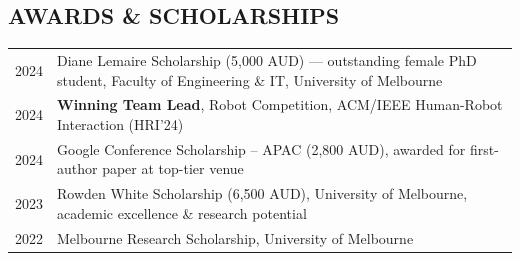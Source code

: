 \documentclass[a4paper, 11pt]{article}
\begin{document}
{\subsection{AWARDS \& SCHOLARSHIPS}
\vspace{2pt}

\noindent
\begin{tabularx}{\textwidth}{@{}lX@{}}
2024 & Diane Lemaire Scholarship (5,000 AUD) --- outstanding female PhD student, Faculty of Engineering \& IT, University of Melbourne \\[2pt]
2024 & \textbf{Winning Team Lead}, Robot Competition, ACM/IEEE Human-Robot Interaction (HRI'24) \\[2pt]
2024 & Google Conference Scholarship -- APAC (2,800 AUD), awarded for first-author paper at top-tier venue \\[2pt]
2023 & Rowden White Scholarship (6,500 AUD), University of Melbourne, academic excellence \& research potential \\[2pt]
2022 & Melbourne Research Scholarship, University of Melbourne \\
\end{tabularx}

} %
\end{document}
